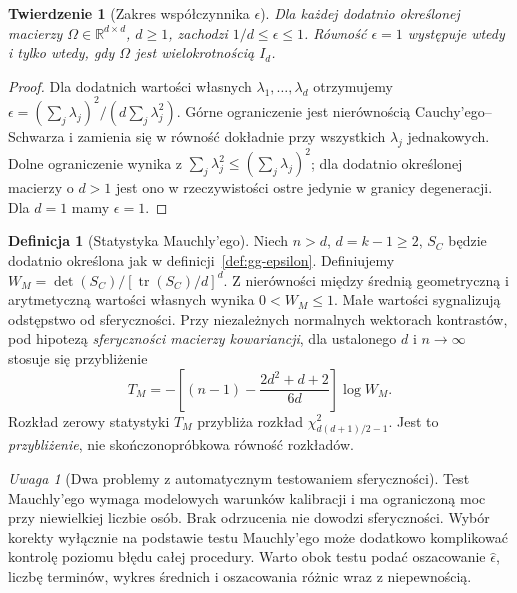 \documentclass[11pt,a4paper,oneside]{report}
\numberwithin{equation}{chapter}
\theoremstyle{plain}
\newtheorem{twierdzenie}{Twierdzenie}[chapter]
\theoremstyle{definition}
\newtheorem{definicja}{Definicja}[chapter]
\theoremstyle{remark}
\newtheorem{uwaga}{Uwaga}[chapter]
\newcommand{\R}{\mathbb R}
\begin{document}
\begin{twierdzenie}[Zakres współczynnika $\epsilon$]\label{thm:gg-bound}
Dla każdej dodatnio określonej macierzy $\Omega\in\R^{d\times d}$, $d\ge1$, zachodzi $1/d\le\epsilon\le1$. Równość $\epsilon=1$ występuje wtedy i tylko wtedy, gdy $\Omega$ jest wielokrotnością $I_d$.
\end{twierdzenie}
\begin{proof}
Dla dodatnich wartości własnych $\lambda_1,\ldots,\lambda_d$ otrzymujemy $\epsilon=(\sum_j\lambda_j)^2/(d\sum_j\lambda_j^2)$. Górne ograniczenie jest nierównością Cauchy'ego--Schwarza i zamienia się w równość dokładnie przy wszystkich $\lambda_j$ jednakowych. Dolne ograniczenie wynika z $\sum_j\lambda_j^2\le(\sum_j\lambda_j)^2$; dla dodatnio określonej macierzy o $d>1$ jest ono w rzeczywistości ostre jedynie w granicy degeneracji. Dla $d=1$ mamy $\epsilon=1$.
\end{proof}

\begin{definicja}[Statystyka Mauchly'ego]\label{def:mauchly}
Niech $n>d$, $d=k-1\ge2$, $S_C$ będzie dodatnio określona jak w definicji~\ref{def:gg-epsilon}. Definiujemy $W_M=\det(S_C)/[\operatorname{tr}(S_C)/d]^d$. Z nierówności między średnią geometryczną i arytmetyczną wartości własnych wynika $0<W_M\le1$. Małe wartości sygnalizują odstępstwo od sferyczności. Przy niezależnych normalnych wektorach kontrastów, pod hipotezą \emph{sferyczności macierzy kowariancji}, dla ustalonego $d$ i $n\to\infty$ stosuje się przybliżenie
\[
 T_M=-\left[(n-1)-\frac{2d^2+d+2}{6d}\right]\log W_M.
\]
Rozkład zerowy statystyki $T_M$ przybliża rozkład $\chi^2_{d(d+1)/2-1}$. Jest to \emph{przybliżenie}, nie skończonopróbkowa równość rozkładów.
\end{definicja}

\begin{uwaga}[Dwa problemy z automatycznym testowaniem sferyczności]
Test Mauchly'ego wymaga modelowych warunków kalibracji i ma ograniczoną moc przy niewielkiej liczbie osób. Brak odrzucenia nie dowodzi sferyczności. Wybór korekty wyłącznie na podstawie testu Mauchly'ego może dodatkowo komplikować kontrolę poziomu błędu całej procedury. Warto obok testu podać oszacowanie $\widehat\epsilon$, liczbę terminów, wykres średnich i oszacowania różnic wraz z niepewnością.
\end{uwaga}
\end{document}
